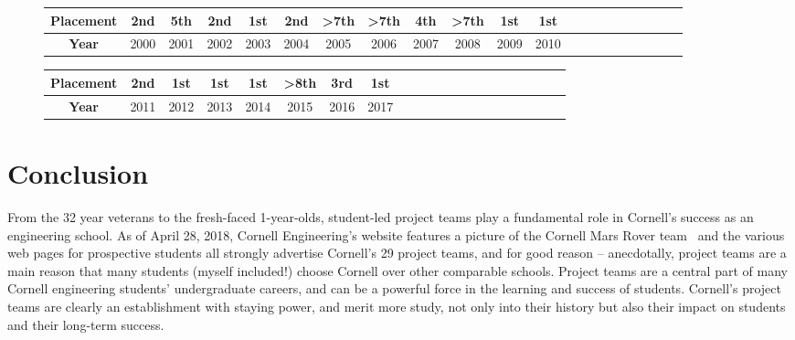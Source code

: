 \documentclass[12pt]{article}
\begin{document}
\begin{figure}
  \centering

  \begin{tabular}{|c||c|c|c|c|c|c|c|c|c|c|c|c|c|c|c|c|c|c|c|c|}
    \hline
    \textbf{Placement} & \cellcolor{gray!50}2nd & 5th & \cellcolor{gray!50}2nd & \cellcolor{Goldenrod}1st & \cellcolor{gray!50}2nd & \textgreater 7th & \textgreater 7th & 4th & \textgreater 7th & \cellcolor{Goldenrod}1st & \cellcolor{Goldenrod}1st \\
    \hline
    \textbf{Year} & 2000 & 2001 & 2002 & 2003 & 2004 & 2005 & 2006 & 2007 & 2008 & 2009 & 2010\\
    \hline
  \end{tabular}
  \vspace{0.3cm}

  \begin{tabular}{|c||c|c|c|c|c|c|c|c|c|c|c|c|c|c|c|c|c|c|c|c|}
    \hline
    \textbf{Placement} & \cellcolor{gray!50}2nd & \cellcolor{Goldenrod}1st & \cellcolor{Goldenrod}1st & \cellcolor{Goldenrod}1st & \textgreater 8th & \cellcolor{RawSienna!75}3rd & \cellcolor{Goldenrod}1st\\
    \hline
    \textbf{Year} & 2011 & 2012 & 2013 & 2014 & 2015 & 2016 & 2017\\
    \hline
  \end{tabular}
  \label{table:cuauv}
\end{figure}

\section{Conclusion}
\label{sec:conclusion}

From the 32 year veterans to the fresh-faced 1-year-olds, student-led project teams play a fundamental role in Cornell's success as an engineering school.
As of April 28, 2018, Cornell Engineering's website features a picture of the Cornell Mars Rover team~\cite{fleischman_rovers_2018} and the various web pages for prospective students all strongly advertise Cornell's 29 project teams, and for good reason -- anecdotally, project teams are a main reason that many students (myself included!) choose Cornell over other comparable schools.
Project teams are a central part of many Cornell engineering students' undergraduate careers, and can be a powerful force in the learning and success of students.
Cornell's project teams are clearly an establishment with staying power, and merit more study, not only into their history but also their impact on students and their long-term success.

\singlespacing


\end{document}
